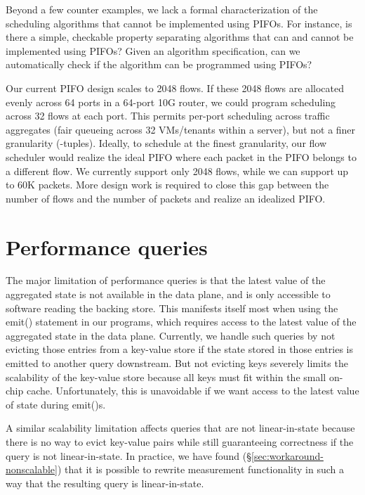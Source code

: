 Beyond a few counter examples, we lack a formal characterization of the
scheduling algorithms that cannot be implemented using PIFOs. For instance, is
there a simple, checkable property separating algorithms that can and cannot be
implemented using PIFOs? Given an algorithm specification, can we automatically
check if the algorithm can be programmed using PIFOs?

Our current PIFO design scales to 2048 flows. If these 2048 flows are allocated
evenly across 64 ports in a 64-port 10G router, we could program scheduling
across 32 flows at each port. This permits per-port scheduling across traffic
aggregates (\eg fair queueing across 32 VMs/tenants within a server), but not
a finer granularity (-tuples). Ideally, to schedule at the finest
granularity, our flow scheduler would realize the ideal PIFO where each packet
in the PIFO belongs to a different flow. We currently support only 2048 flows,
while we can support up to 60K packets.  More design work is required to close
this gap between the number of flows and the number of packets and realize an
idealized PIFO.


\section{Performance queries}
\label{sec:pq_limitations}

The major limitation of performance queries is that the latest value of the
aggregated state is not available in the data plane, and is only accessible to
software reading the backing store. This manifests itself most when using the
{\ct emit()} statement in our programs, which requires access to the latest value of the
aggregated state in the data plane. Currently, we handle such queries by not
evicting those entries from a key-value store if the state stored in those
entries is emitted to another query downstream. But not evicting keys severely
limits the scalability of the key-value store because all keys must fit within
the small on-chip cache. Unfortunately, this is unavoidable if we want access to the latest
value of state during {\ct emit()}s.

A similar scalability limitation affects queries that are not linear-in-state
because there is no way to evict key-value pairs while still guaranteeing
correctness if the query is not linear-in-state. In practice, we have found
(\S\ref{sec:workaround-nonscalable}) that it is possible to rewrite measurement
functionality in such a way that the resulting query is linear-in-state.
